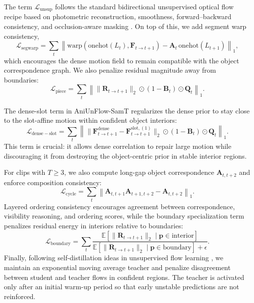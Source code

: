The term $\mathcal{L}_{\mathrm{unsup}}$ follows the standard bidirectional unsupervised optical flow recipe based on photometric reconstruction, smoothness, forward--backward consistency, and occlusion-aware masking \cite{unflow}. On top of this, we add segment warp consistency,
\begin{equation}
\mathcal{L}_{\mathrm{segwarp}} = \sum_t \left\| \mathrm{warp}(\mathrm{onehot}(L_t),\mathbf{F}_{t\rightarrow t+1}) - \mathbf{A}_t\,\mathrm{onehot}(L_{t+1}) \right\|_1,
\end{equation}
which encourages the dense motion field to remain compatible with the object correspondence graph. We also penalize residual magnitude away from boundaries:
\begin{equation}
\mathcal{L}_{\mathrm{piece}} = \sum_t \left\| \|\mathbf{R}_{t\rightarrow t+1}\|_2 \odot (1-\mathbf{B}_t) \odot \mathbf{Q}_t \right\|_1.
\end{equation}

The dense-slot term in AniUnFlow-SamT regularizes the dense prior to stay close to the slot-affine motion within confident object interiors:
\begin{equation}
\mathcal{L}_{\mathrm{dense-slot}} = \sum_t \left\| \|\mathbf{F}^{\mathrm{dense}}_{t\rightarrow t+1} - \mathbf{F}^{\mathrm{slot},(1)}_{t\rightarrow t+1}\|_2 \odot (1-\mathbf{B}_t) \odot \mathbf{Q}_t \right\|_1.
\end{equation}
This term is crucial: it allows dense correlation to repair large motion while discouraging it from destroying the object-centric prior in stable interior regions.

For clips with $T\geq 3$, we also compute long-gap object correspondence $\mathbf{A}_{t,t+2}$ and enforce composition consistency:
\begin{equation}
\mathcal{L}_{\mathrm{cycle}} = \sum_t \left\| \mathbf{A}_{t,t+1}\mathbf{A}_{t+1,t+2} - \mathbf{A}_{t,t+2} \right\|_1.
\end{equation}
Layered ordering consistency encourages agreement between correspondence, visibility reasoning, and ordering scores, while the boundary specialization term penalizes residual energy in interiors relative to boundaries:
\begin{equation}
\mathcal{L}_{\mathrm{boundary}} = \sum_t \frac{\mathbb{E}[\|\mathbf{R}_{t\rightarrow t+1}\|_2 \mid \mathbf{p}\in \mathrm{interior}]}{\mathbb{E}[\|\mathbf{R}_{t\rightarrow t+1}\|_2 \mid \mathbf{p}\in \mathrm{boundary}] + \epsilon}.
\end{equation}
Finally, following self-distillation ideas in unsupervised flow learning \cite{ddflow}, we maintain an exponential moving average teacher and penalize disagreement between student and teacher flows in confident regions. The teacher is activated only after an initial warm-up period so that early unstable predictions are not reinforced.

